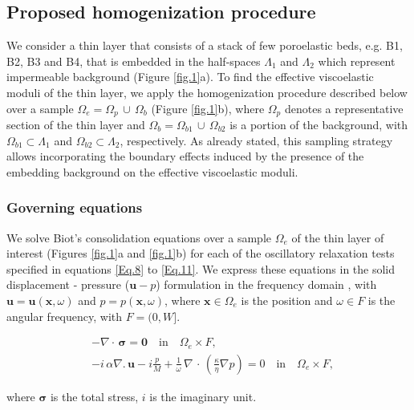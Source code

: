 \documentclass[draft]{agujournal2019}
\begin{document}
\subsection{Proposed homogenization procedure}
We consider a thin layer that consists of a stack of few poroelastic beds, e.g. B1, B2, B3 and B4, that is embedded in the half-spaces $\Lambda_1$ and $\Lambda_2$ which represent impermeable background (Figure \ref{fig.1}a). To find the effective viscoelastic moduli of the thin layer, we apply the homogenization procedure described below over a sample $\Omega_e = \Omega_p \,\cup \, \Omega_b$ (Figure \ref{fig.1}b), where $\Omega_p$ denotes a representative section of the thin  layer and $\Omega_b =\Omega_{b1}\, \cup \, \Omega_{b2}$ is a portion of the background, with $\Omega_{b1} \subset \Lambda_1$ and $\Omega_{b2} \subset \Lambda_2$, respectively. As already stated, this sampling strategy allows incorporating the boundary effects induced by the presence of the embedding background on the effective viscoelastic moduli.


\subsubsection{Governing equations}
We solve Biot's consolidation equations \cite{Biot1941, Biot1962} over a sample  $\Omega_e$ of the thin layer of interest (Figures \ref{fig.1}a and \ref{fig.1}b) for each of the oscillatory relaxation tests specified in equations
\eqref{Eq.8} to \eqref{Eq.11}. We express these equations in the solid displacement - pressure ($\bm{u}-p$) formulation in the frequency domain \cite{Quintal2011,Favino2020},  with $\bm{u} = \bm{u}(\bm{x}, \omega)$ and $p = p(\bm{x},\omega)$, where $\bm{x} \in \Omega_e$ is the position and $\omega \in F$ is the angular frequency, with $F =(0,W]$. 
\begin{linenomath*}
\begin{equation}\label{Eq.6}
\begin{split}
& - \nabla \cdot \, \bm{\sigma} = \bm{0}  \quad  \textrm{in} \quad \Omega_e \times F,  \\
& - i \, \alpha \nabla . \, \bm{u} -i \frac{p}{M} + \frac{1}{\omega} \,\nabla \, \cdot \, \left( \frac{\kappa}{\eta} \nabla p\right)  =0 \quad  \textrm{in} \quad \Omega_e \times F,
\end{split}
\end{equation}
\end{linenomath*}
where $\bm{\sigma}$ is the total stress, $i$ is the imaginary unit.
\end{document}
